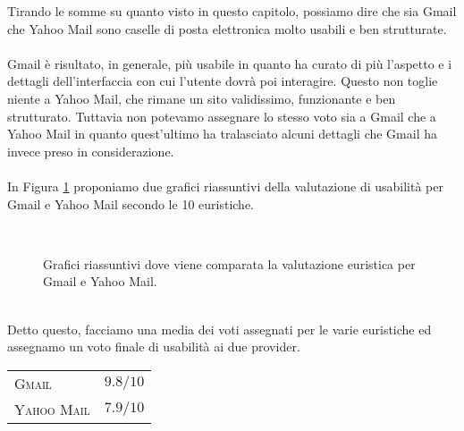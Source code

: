 		Tirando le somme su quanto visto in questo capitolo, possiamo dire che sia Gmail che Yahoo Mail sono caselle di posta elettronica molto usabili e ben strutturate.\\
		\\
		Gmail è risultato, in generale, più usabile in quanto ha curato di più l'aspetto e i dettagli dell'interfaccia con cui l'utente dovrà poi interagire. Questo non toglie niente a Yahoo Mail, che rimane un sito validissimo, funzionante e ben strutturato. Tuttavia non potevamo assegnare lo stesso voto sia a Gmail che a Yahoo Mail in quanto quest'ultimo ha tralasciato alcuni dettagli che Gmail ha invece preso in considerazione.\\
		\\
		In Figura \ref{fig:valutazione_euristica} proponiamo due grafici riassuntivi della valutazione di usabilità per Gmail e Yahoo Mail secondo le 10 euristiche.
		\begin{figure}[h!]
			\begin{center}
				\\
			\end{center}
			\caption[Grafici della valutazione euristica]{Grafici riassuntivi dove viene comparata la valutazione euristica per Gmail e Yahoo Mail.}
			\label{fig:valutazione_euristica}
		\end{figure}
		\\
		
		Detto questo, facciamo una media dei voti assegnati per le varie euristiche ed assegnamo un voto finale di usabilità ai due provider.
		
		\begin{flushleft}
			\begin{tabular}{lr}
				\textsc{Gmail} & $9.8/10$\\
				\textsc{Yahoo Mail} & $7.9/10$
			\end{tabular}
		\end{flushleft}
		